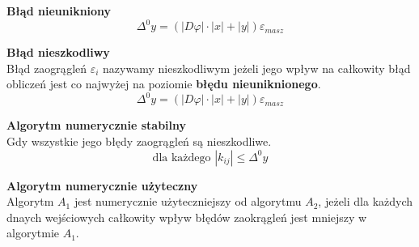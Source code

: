 \documentclass[../mn-notatki.tex]{subfiles}
\begin{document}
\begin{tcolorbox}
\textbf{Błąd nieunikniony}\\
\[
\Delta^0y = \left(|D\varphi|\cdot|x| + |y| \right)\varepsilon_{masz}
\]
\end{tcolorbox}

\begin{tcolorbox}
\textbf{Błąd nieszkodliwy}\\
Błąd zaogrągleń $\varepsilon_i$ nazywamy nieszkodliwym jeżeli jego wpływ na
całkowity błąd obliczeń jest co najwyżej na poziomie \textbf{błędu nieuniknionego}.\\
\[
\Delta^0y = \left(|D\varphi|\cdot|x| + |y| \right)\varepsilon_{masz}
\]
\end{tcolorbox}

\begin{tcolorbox}
\textbf{Algorytm numerycznie stabilny}\\
Gdy wszystkie jego błędy zaogrągleń są nieszkodliwe.
\[
\text{dla każdego~} |k_{ij}|\leqslant \Delta^0y
\]
\end{tcolorbox}

\begin{tcolorbox}
\textbf{Algorytm numerycznie użyteczny}\\
Algorytm $A_1$ jest numerycznie użyteczniejszy od algorytmu $A_2$, jeżeli dla
każdych dnaych wejściowych całkowity wpływ błędów zaokrągleń jest mniejszy
w algorytmie $A_1$.
\end{tcolorbox}
\end{document}
